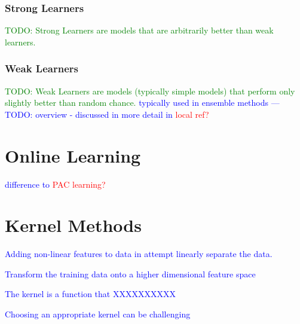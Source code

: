 \subsubsection{Strong Learners}

\textcolor{green}{TODO: Strong Learners are models that are arbitrarily better than weak learners.}

\subsubsection{Weak Learners}

\textcolor{green}{TODO: Weak Learners are models (typically simple models) that perform only slightly better than random chance.} \textcolor{blue}{typically used in ensemble methods --- TODO: overview - discussed in more detail in \textcolor{red}{local ref?}}


\section{Online Learning}

\textcolor{blue}{difference to \textcolor{red}{PAC learning?}}



\section{Kernel Methods}
\label{sec:kernel_trick}

\textcolor{blue}{Adding non-linear features to data in attempt linearly separate the data.}


\textcolor{blue}{Transform the training data onto a higher dimensional feature space}


\textcolor{blue}{The kernel is a function that XXXXXXXXXX}

\textcolor{blue}{Choosing an appropriate kernel can be challenging}


